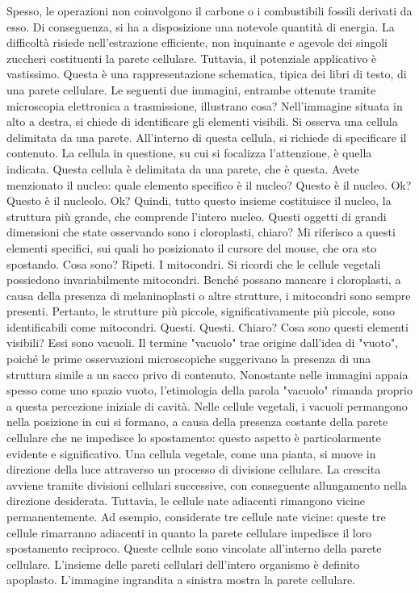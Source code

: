\documentclass[11pt, a4paper]{article}
\begin{document}
\begin{spacing}{1}
Spesso, le operazioni non coinvolgono il carbone o i combustibili fossili derivati da esso. Di conseguenza, si ha a disposizione una notevole quantità di energia. La difficoltà risiede nell'estrazione efficiente, non inquinante e agevole dei singoli zuccheri costituenti la parete cellulare. Tuttavia, il potenziale applicativo è vastissimo. Questa è una rappresentazione schematica, tipica dei libri di testo, di una parete cellulare. Le seguenti due immagini, entrambe ottenute tramite microscopia elettronica a trasmissione, illustrano cosa?
Nell'immagine situata in alto a destra, si chiede di identificare gli elementi visibili. Si osserva una cellula delimitata da una parete. All'interno di questa cellula, si richiede di specificare il contenuto. La cellula in questione, su cui si focalizza l'attenzione, è quella indicata.
Questa cellula è delimitata da una parete, che è questa. Avete menzionato il nucleo: quale elemento specifico è il nucleo?
Questo è il nucleo. Ok? Questo è il nucleolo. Ok? Quindi, tutto questo insieme costituisce il nucleo, la struttura più grande, che comprende l'intero nucleo.
Questi oggetti di grandi dimensioni che state osservando sono i cloroplasti, chiaro? Mi riferisco a questi elementi specifici, sui quali ho posizionato il cursore del mouse, che ora sto spostando.
Cosa sono? Ripeti. I mitocondri.
Si ricordi che le cellule vegetali possiedono invariabilmente mitocondri. Benché possano mancare i cloroplasti, a causa della presenza di melaninoplasti o altre strutture, i mitocondri sono sempre presenti. Pertanto, le strutture più piccole, significativamente più piccole, sono identificabili come mitocondri. Questi. Questi. Chiaro?
Cosa sono questi elementi visibili? Essi sono vacuoli.
Il termine "vacuolo" trae origine dall'idea di "vuoto", poiché le prime osservazioni microscopiche suggerivano la presenza di una struttura simile a un sacco privo di contenuto. Nonostante nelle immagini appaia spesso come uno spazio vuoto, l'etimologia della parola "vacuolo" rimanda proprio a questa percezione iniziale di cavità. Nelle cellule vegetali, i vacuoli permangono nella posizione in cui si formano, a causa della presenza costante della parete cellulare che ne impedisce lo spostamento: questo aspetto è particolarmente evidente e significativo.
Una cellula vegetale, come una pianta, si muove in direzione della luce attraverso un processo di divisione cellulare. La crescita avviene tramite divisioni cellulari successive, con conseguente allungamento nella direzione desiderata. Tuttavia, le cellule nate adiacenti rimangono vicine permanentemente. Ad esempio, considerate tre cellule nate vicine: queste tre cellule rimarranno adiacenti in quanto la parete cellulare impedisce il loro spostamento reciproco. Queste cellule sono vincolate all'interno della parete cellulare. L'insieme delle pareti cellulari dell'intero organismo è definito apoplasto. L'immagine ingrandita a sinistra mostra la parete cellulare.

\end{spacing}
\end{document}
